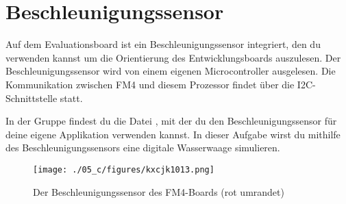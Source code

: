 \section{\ExercisePrefixEmbeddedC Beschleunigungssensor \optional}

\optionaltextbox

Auf dem Evaluationsboard ist ein Beschleunigungssensor integriert, den du verwenden kannst um die Orientierung des Entwicklungsboards auszulesen.
Der Beschleunigungssensor wird von einem eigenen Microcontroller ausgelesen.
Die Kommunikation zwischen FM4 und diesem Prozessor findet über die I2C-Schnittstelle statt.

In der Gruppe  findest du die Datei , mit der du den Beschleunigungssensor für deine eigene Applikation verwenden kannst.
In dieser Aufgabe wirst du mithilfe des Beschleunigungssensors eine digitale Wasserwaage simulieren. 
%
\begin{figure}[!htb]
	\centering
	\texttt{[image: ./05\_c/figures/kxcjk1013.png]}
	\caption{Der Beschleunigungssensor des FM4-Boards (rot umrandet)}
	\label{fig:accelerometer}
\end{figure} 

